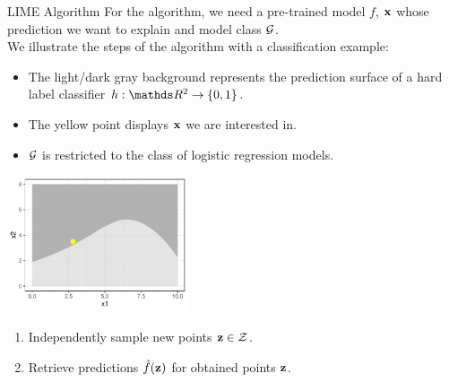 \documentclass[11pt,compress,t,notes=noshow, xcolor=table]{beamer}
\begin{document}
\begin{vbframe}{LIME Algorithm}
		For the algorithm, we need a pre-trained model $f$, $\xv$ whose prediction we want to explain and model class $\Gspace$.\\ \vspace{0.5cm}
		We illustrate the steps of the algorithm with a classification example: 
		\begin{itemize}
			\item The light/dark gray background represents the prediction surface of a hard label classifier $h: \R^2 \to \{0, 1\}$.
			\item The yellow point displays $\xv$ we are interested in. 
			\item $\Gspace$ is restricted to the class of logistic regression models. 
		\end{itemize}
		\begin{center}
			\includegraphics[width=0.4\textwidth]{figure/lime2}
		\end{center}
	
		\begin{enumerate}
		\framebreak 
		\item Independently sample new points $\zv \in \Zspace$. 
		\item Retrieve predictions $\fh(\zv)$ for obtained points $\zv$. \\[0.2cm]
		

\end{enumerate}
\end{vbframe}
\end{document}
